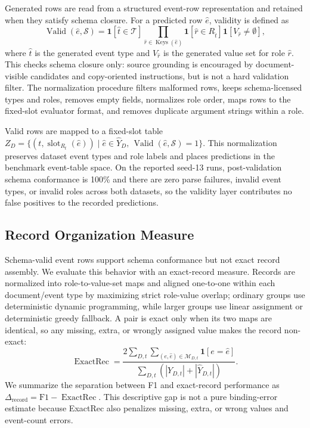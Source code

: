 \documentclass[runningheads]{llncs}
\begin{document}
Generated rows are read from a structured event-row representation and retained when they satisfy schema closure. For a predicted row $\hat{e}$, validity is defined as
\begin{equation}
\operatorname{Valid}(\hat{e},\mathcal{S})
=\mathbf{1}[\hat{t}\in \mathcal{T}]\prod_{\hat{r}\in \operatorname{Keys}(\hat{e})}
\mathbf{1}[\hat{r}\in R_{\hat{t}}]\mathbf{1}[V_{\hat{r}}\neq\emptyset],
\label{eq:schema-validity}
\end{equation}
where $\hat{t}$ is the generated event type and $V_{\hat{r}}$ is the generated value set for role $\hat{r}$. This checks schema closure only: source grounding is encouraged by document-visible candidates and copy-oriented instructions, but is not a hard validation filter. The normalization procedure filters malformed rows, keeps schema-licensed types and roles, removes empty fields, normalizes role order, maps rows to the fixed-slot evaluator format, and removes duplicate argument strings within a role.

Valid rows are mapped to a fixed-slot table $Z_D=\{(t,\operatorname{slot}_{R_t}(\hat{e}))\mid \hat{e}\in\hat{Y}_D,\,\operatorname{Valid}(\hat{e},\mathcal{S})=1\}$. This normalization preserves dataset event types and role labels and places predictions in the benchmark event-table space. On the reported seed-13 runs, post-validation schema conformance is 100\% and there are zero parse failures, invalid event types, or invalid roles across both datasets, so the validity layer contributes no false positives to the recorded predictions.

\subsection{Record Organization Measure}

Schema-valid event rows support schema conformance but not exact record assembly. We evaluate this behavior with an exact-record measure. Records are normalized into role-to-value-set maps and aligned one-to-one within each document/event type by maximizing strict role-value overlap; ordinary groups use deterministic dynamic programming, while larger groups use linear assignment or deterministic greedy fallback. A pair is exact only when its two maps are identical, so any missing, extra, or wrongly assigned value makes the record non-exact:
\begin{equation}
\operatorname{ExactRec}=
\frac{2\sum_{D,t}\sum_{(e,\hat{e})\in\mathcal{M}_{D,t}}
\mathbf{1}[e=\hat{e}]}
{\sum_{D,t}\left(|Y_{D,t}|+|\hat{Y}_{D,t}|\right)}.
\label{eq:exact-record}
\end{equation}
We summarize the separation between F1 and exact-record performance as $\Delta_{\mathrm{record}}=\mathrm{F1}-\operatorname{ExactRec}$. This descriptive gap is not a pure binding-error estimate because ExactRec also penalizes missing, extra, or wrong values and event-count errors.
\end{document}
